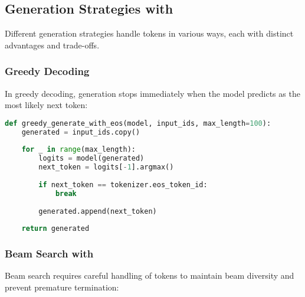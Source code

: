 \subsection{Generation Strategies with \eos{}}

Different generation strategies handle \eos{} tokens in various ways, each with distinct advantages and trade-offs.

\subsubsection{Greedy Decoding}

In greedy decoding, generation stops immediately when the model predicts \eos{} as the most likely next token:

\begin{lstlisting}[language=Python, caption=Greedy generation with \eos{} stopping]
def greedy_generate_with_eos(model, input_ids, max_length=100):
    generated = input_ids.copy()
    
    for _ in range(max_length):
        logits = model(generated)
        next_token = logits[-1].argmax()
        
        if next_token == tokenizer.eos_token_id:
            break
            
        generated.append(next_token)
    
    return generated
\end{lstlisting}

\subsubsection{Beam Search with \eos{}}

Beam search requires careful handling of \eos{} tokens to maintain beam diversity and prevent premature termination:
\begin{comment}
Feedback: This is a key point that often trips up practitioners. It would be valuable to explain *why* it's tricky. For example: "The challenge in beam search is that a shorter, completed sequence (one that has generated an [EOS] token) might have a higher probability than a longer, more promising sequence that is still being generated. Simply picking the highest-probability sequence at each step could lead to prematurely short outputs. Therefore, completed beams must be set aside and compared only at the very end, often with a length penalty to balance score and length."

STATUS: addressed - added explanation of beam search complexity and length balancing challenges
\end{comment}

